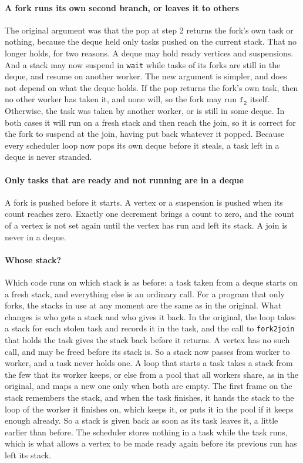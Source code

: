 \documentclass[sigplan,nonacm]{acmart}
\newcommand{\ft}{\mathtt{f_2}}
\begin{document}
\paragraph{A fork runs its own second branch, or leaves it to others}
%
The original argument was that the pop at step 2 returns the fork's own
task or nothing, because the deque held only tasks pushed on the
current stack.
%
That no longer holds, for two reasons.
%
A deque may hold ready vertices and suspensions.
%
And a stack may now suspend in \lstinline|wait| while tasks of its
forks are still in the deque, and resume on another worker.
%
The new argument is simpler, and does not depend on what the deque
holds.
%
If the pop returns the fork's own task, then no other worker has taken
it, and none will, so the fork may run $\ft$ itself.
%
Otherwise, the task was taken by another worker, or is still in some
deque.
%
In both cases it will run on a fresh stack and then reach the join, so
it is correct for the fork to suspend at the join, having put back
whatever it popped.
%
Because every scheduler loop now pops its own deque before it steals,
a task left in a deque is never stranded.

\paragraph{Only tasks that are ready and not running are in a deque}
%
A fork is pushed before it starts.
%
A vertex or a suspension is pushed when its count reaches zero.
%
Exactly one decrement brings a count to zero, and the count of a
vertex is not set again until the vertex has run and left its stack.
%
A join is never in a deque.

\paragraph{Whose stack?}
%
Which code runs on which stack is as before: a task taken from a
deque starts on a fresh stack, and everything else is an ordinary
call.
%
For a program that only forks, the stacks in use at any moment are the
same as in the original.
%
What changes is who gets a stack and who gives it back.
%
In the original, the loop takes a stack for each stolen task and
records it in the task, and the call to \lstinline|fork2join| that
holds the task gives the stack back before it returns.
%
A vertex has no such call, and may be freed before its stack is.
%
So a stack now passes from worker to worker, and a task never holds
one.
%
A loop that starts a task takes a stack from the few that its worker
keeps, or else from a pool that all workers share, as in the
original, and maps a new one only when both are empty.
%
The first frame on the stack remembers the stack, and when the task
finishes, it hands the stack to the loop of the worker it finishes on,
which keeps it, or puts it in the pool if it keeps enough already.
%
So a stack is given back as soon as its task leaves it, a little
earlier than before.
%
The scheduler stores nothing in a task while the task runs, which is
what allows a vertex to be made ready again before its previous run
has left its stack.
\end{document}
